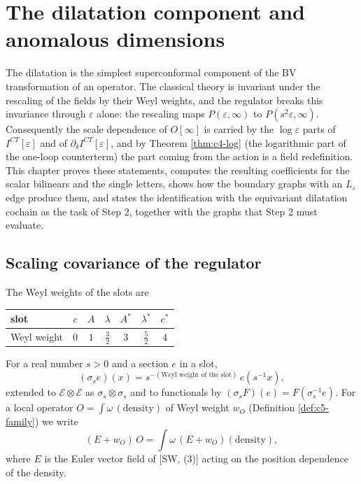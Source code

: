 \chapter{The dilatation component and anomalous dimensions}

The dilatation is the simplest superconformal component of the BV transformation of an operator. The classical theory is invariant under the rescaling of the fields by their Weyl weights, and the regulator breaks this invariance through $\varepsilon$ alone: the rescaling maps $P(\varepsilon,\infty)$ to $P(s^2\varepsilon,\infty)$. Consequently the scale dependence of $O[\infty]$ is carried by the $\log\varepsilon$ parts of $I^{CT}[\varepsilon]$ and of $\partial_\delta I^{CT}[\varepsilon]$, and by Theorem \ref{thm:c4-log} (the logarithmic part of the one-loop counterterm) the part coming from the action is a field redefinition. This chapter proves these statements, computes the resulting coefficients for the scalar bilinears and the single letters, shows how the boundary graphs with an $L_\varepsilon$ edge produce them, and states the identification with the equivariant dilatation cochain as the task of Step 2, together with the graphs that Step 2 must evaluate.

\section{Scaling covariance of the regulator}

\begin{definition}
\label{def:c6-sigma}
The Weyl weights of the slots are

\begin{tabular}{l|c|c|c|c|c|c}
slot & $c$ & $A$ & $\lambda$ & $A^*$ & $\lambda^*$ & $c^*$ \\
\hline
Weyl weight & $0$ & $1$ & $\tfrac32$ & $3$ & $\tfrac52$ & $4$ \\
\end{tabular}

For a real number $s>0$ and a section $e$ in a slot,
\[
(\sigma_s e)(x)=s^{-(\text{Weyl weight of the slot})}\,e(s^{-1}x),
\]
extended to $\mathscr E\otimes\mathscr E$ as $\sigma_s\otimes\sigma_s$ and to functionals by $(\sigma_s F)(e)=F(\sigma_s^{-1}e)$. For a local operator $O=\int\omega\,(\text{density})$ of Weyl weight $w_O$ (Definition \ref{def:c5-family}) we write
\[
(E+w_O)\,O=\int\omega\,(E+w_O)(\text{density}),
\]
where $E$ is the Euler vector field of [SW, (3)] acting on the position dependence of the density.
\end{definition}

